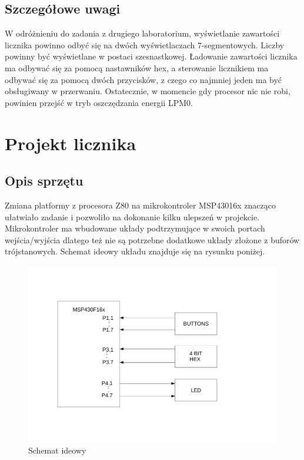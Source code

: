 \documentclass[a4paper,titlepage,11pt,floatssmall]{mwrep}
\begin{document}
\section{Szczegółowe uwagi}
\indent W odróżnieniu do zadania z drugiego laboratorium, wyświetlanie zawartości licznika powinno odbyć się na dwóch wyświetlaczach 7-segmentowych. Liczby powinny być wyświetlane w postaci szesnastkowej. Ładowanie zawartości licznika ma odbywać się za pomocą nastawników hex, a sterowanie licznikiem ma odbywać się za pomocą dwóch przycisków, z czego co najmniej jeden ma być obsługiwany w przerwaniu. Ostatecznie, w momencie gdy procesor nic nie robi, powinien przejść w tryb oszczędzania energii LPM0.

\chapter{Projekt licznika}

\section{Opis sprzętu}
\indent{} Zmiana platformy z procesora Z80 na mikrokontroler MSP43016x znacząco ułatwiało zadanie i pozwoliło na dokonanie kilku ulepszeń w projekcie. Mikrokontroler ma wbudowane układy podtrzymujące w swoich portach wejścia/wyjścia dlatego też nie są potrzebne dodatkowe układy złożone z buforów trójstanowych. Schemat ideowy układu znajduje się na rysunku poniżej.

\begin{figure}[th]
\centering
\includegraphics[width=\textwidth]{ideowy}
\caption{Schemat ideowy}
\end{figure}
\end{document}
